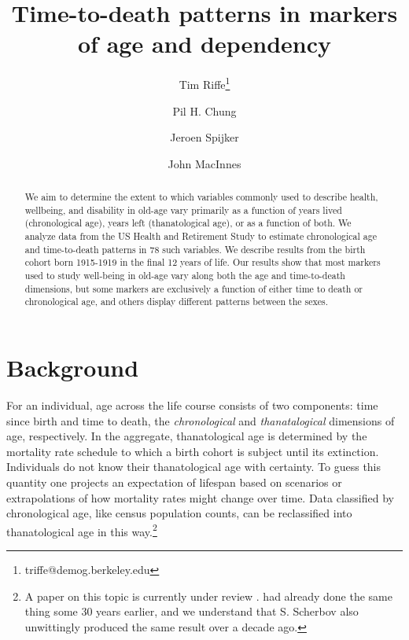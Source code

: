 \documentclass[11pt,oneside]{article} %
\begin{document}
\title{Time-to-death patterns in markers of age and dependency}

\author[1]{Tim Riffe\thanks{triffe@demog.berkeley.edu}}
\author[1]{Pil H. Chung}
\author[2]{Jeroen Spijker}
\author[3]{John MacInnes}



\maketitle

\begin{abstract}
We aim to determine the extent to which variables commonly
used to describe health, wellbeing, and disability in old-age vary primarily
as a function of years lived (chronological age), years left (thanatological
age), or as a function of both.
We analyze data from the US Health and Retirement Study to estimate chronological age and time-to-death patterns in 78 such variables. We describe
results from the birth cohort born 1915-1919 in the final 12 years of life. Our results show
that most markers used to study well-being in old-age vary along both the age
and time-to-death dimensions, but some markers are exclusively a function of
either time to death or chronological age, and others display different patterns
between the sexes.
\end{abstract}

\section*{Background}

For an
individual, age across the life course consists of two components: time since
birth and time to death, the \textit{chronological} and \textit{thanatalogical}
dimensions of age, respectively. In the aggregate, thanatological age is determined
by the mortality rate schedule to which a birth cohort is subject until its
extinction. Individuals do not know their thanatological age with certainty. To
guess this quantity one projects an expectation of lifespan based on scenarios
or extrapolations of how mortality rates might change over time. Data classified by chronological age, like census population counts, can be
reclassified into thanatological age in this way.\footnote{A paper on this topic
is currently under review \citep{riffe2014paaposter}. \citet{brouard1986structure,
brouard1989mouvements} had already done the same thing some 30 years earlier, and we understand that S. Scherbov also unwittingly produced the same result over a decade ago.} 
\end{document}
